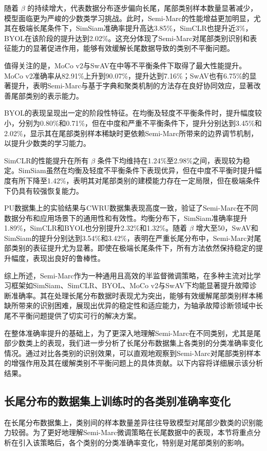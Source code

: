 \documentclass[master]{thesis-uestc}
\begin{document}
随着 \(\beta\) 的持续增大，代表数据分布逐步偏向长尾，尾部类别样本数量显著减少，模型面临更为严峻的少数类学习挑战。此时，Semi-Marc的性能增益更加明显，尤其在极端长尾条件下，SimSiam准确率提升高达3.85\%，SimCLR也提升近3\%，BYOL在该阶段的提升达到2.02\%。这充分体现了Semi-Marc对尾部类别识别和表征能力的显著促进作用，能够有效缓解长尾数据导致的类别不平衡问题。

值得关注的是，MoCo v2与SwAV在中等不平衡条件下取得了最大性能提升。MoCo v2准确率从82.91\%上升到90.07\%，提升达到7.16\%；SwAV也有6.75\%的显著提升，表明Semi-Marc与基于字典和聚类机制的方法存在良好协同效应，显著改善尾部类别的表示能力。

BYOL的表现呈现出一定的阶段性特征。在均衡及轻度不平衡条件时，提升幅度较小，分别为0.80\%和0.71\%，但在中度和严重不平衡条件下，提升分别达到3.45\%和2.02\%，显示其在尾部类别样本稀缺时更依赖Semi-Marc所带来的边界调节机制，以提升少数类的学习能力。

SimCLR的性能提升在所有 \(\beta\) 条件下均维持在1.24\%至2.98\%之间，表现较为稳定。SimSiam虽然在均衡及轻度不平衡条件下表现优异，但在中度不平衡时提升幅度有所下降至1.42\%，表明其对尾部类别的建模能力存在一定局限，但在极端条件下仍具有较强恢复能力。

PU数据集上的实验结果与CWRU数据集表现高度一致，验证了Semi-Marc在不同数据分布和应用场景下的通用性和有效性。均衡分布下，SimSiam准确率提升1.89\%，SimCLR和BYOL也分别提升2.32\%和1.32\%。随着 \(\beta\) 增大至50，SwAV和SimSiam的提升分别达到3.54\%和3.42\%，表明在严重长尾分布中，Semi-Marc对尾部类别的表征提升尤为显著。即使在极端长尾条件下，所有方法依然保持稳定的提升幅度，表现出良好的鲁棒性。

综上所述，Semi-Marc作为一种通用且高效的半监督微调策略，在多种主流对比学习框架如SimSiam、SimCLR、BYOL、MoCo v2与SwAV下均能显著提升故障诊断准确率。其在处理长尾分布数据时表现尤为突出，能够有效缓解尾部类别样本稀缺所带来的识别困难，展现出优异的稳定性和适应能力，为轴承故障诊断领域中长尾不平衡问题提供了切实可行的解决方案。

在整体准确率提升的基础上，为了更深入地理解Semi-Marc在不同类别，尤其是尾部少数类上的表现，我们进一步分析了长尾分布数据集上各类别的分类准确率变化情况。通过对比各类别的识别效果，可以直观地观察到Semi-Marc对尾部类别样本的增强作用及其在缓解类别不平衡问题上的具体贡献。以下内容将详细展示该分析结果。



\subsection{长尾分布的数据集上训练时的各类别准确率变化}
在长尾分布数据集上，类别间的样本数量差异往往导致模型对尾部少数类的识别能力较弱。为了更好地理解Semi-Marc微调策略在长尾数据中的表现，本节将重点分析在引入该策略后，各个类别的分类准确率变化，特别是对尾部类别的影响。
\end{document}
